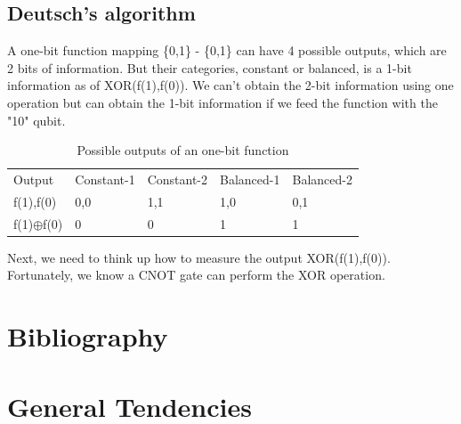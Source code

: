 \documentclass{book}
\begin{document}
\section{Deutsch's algorithm}
A one-bit function mapping \{0,1\} -\> \{0,1\} can have 4 possible outputs, which are 2 bits of information. But their categories, constant or balanced, is a 1-bit information as of XOR(f(1),f(0)). We can't obtain the 2-bit information using one operation but can obtain the 1-bit information if we feed the function with the "10" qubit.

\begin{table}[]
\caption{Possible outputs of an one-bit function}
\label{1function}
\begin{tabular}{lllll}
Output & Constant-1 & Constant-2 & Balanced-1 & Balanced-2                 \\
f(1),f(0)      & 0,0   & 1,1 & 1,0 & 0,1               \\
f(1)$\oplus$f(0)   & 0   & 0  & 1 & 1
\end{tabular}
\end{table}

Next, we need to think up how to measure the output XOR(f(1),f(0)). Fortunately, we know a CNOT gate can perform the XOR operation.

\chapter{Bibliography}

   
 
\chapter{General Tendencies}

\backmatter
{}
\printindex
\end{document}
